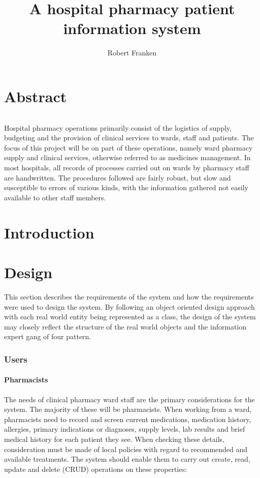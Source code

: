 \documentclass[letterpaper]{amsart}
\author{Robert Franken}
\title{A hospital pharmacy patient information system}
\begin{document}
\maketitle
\part{Abstract}
\paragraph{} Hospital pharmacy operations primarily consist of the logistics of supply, budgeting and the provision of clinical services to wards, staff and patients. 
The focus of this project will be on part of these operations, namely ward pharmacy supply and clinical services, otherwise referred to as medicines management. In most hospitals, all records of processes carried out on wards by pharmacy staff are handwritten. The procedures followed are fairly robust, but slow and susceptible to errors of various kinds, with the information gathered not easily available to other staff members.
\part{Introduction}

\part{Design}
This section describes the requirements of the system and how the requirements were used to design the system. By following an object oriented design approach with each real world entity being represented as a class, the design of the system may closely reflect the structure of the real world objects and the information expert gang of four pattern.

\section{Users} 
\subsection{Pharmacists}
The needs of clinical pharmacy ward staff are the primary considerations for the system.  The majority of these will be pharmacists.  When working from a ward, pharmacists need to record and screen current medications, medication history, allergies, primary indications or diagnoses, supply levels, lab results and brief medical history for each patient they see.
When checking these details, consideration must be made of local policies with regard to recommended and available treatments.  The system should enable them to carry out create, read, update and delete (CRUD) operations on these properties:
\end{document}
